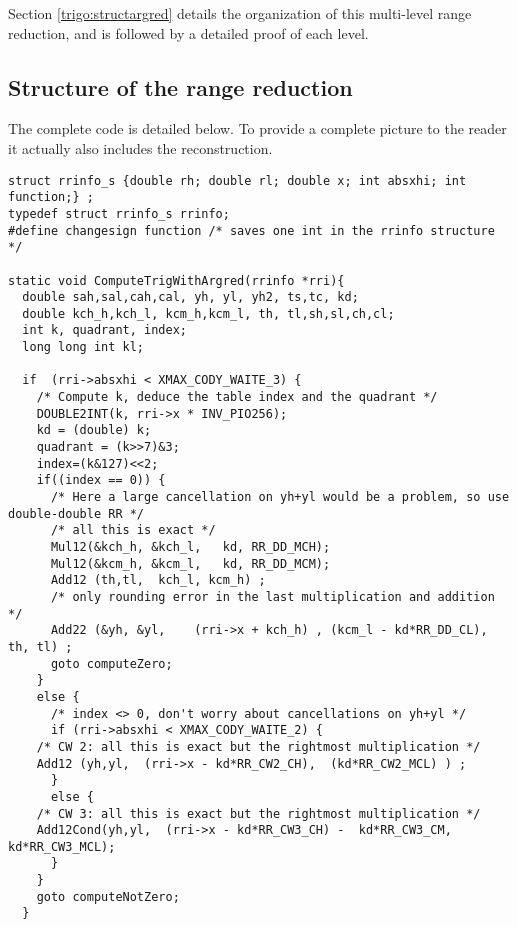 Section \ref{trigo:structargred} details the organization of this
multi-level range reduction, and is followed by a detailed proof of
each level.



\subsection{Structure of the range reduction
  \label{trigo:structargred}} The complete code is detailed below. To
provide a complete picture to the reader it actually also includes the
reconstruction.

\begin{lstlisting}[caption={Multilevel range reduction \label{lst:trig:argred}},firstnumber=1]
struct rrinfo_s {double rh; double rl; double x; int absxhi; int function;} ;
typedef struct rrinfo_s rrinfo;
#define changesign function /* saves one int in the rrinfo structure */

static void ComputeTrigWithArgred(rrinfo *rri){ 
  double sah,sal,cah,cal, yh, yl, yh2, ts,tc, kd; 
  double kch_h,kch_l, kcm_h,kcm_l, th, tl,sh,sl,ch,cl;
  int k, quadrant, index;
  long long int kl;

  if  (rri->absxhi < XMAX_CODY_WAITE_3) {
    /* Compute k, deduce the table index and the quadrant */
    DOUBLE2INT(k, rri->x * INV_PIO256);
    kd = (double) k;
    quadrant = (k>>7)&3;      
    index=(k&127)<<2;
    if((index == 0)) { 
      /* Here a large cancellation on yh+yl would be a problem, so use double-double RR */
      /* all this is exact */
      Mul12(&kch_h, &kch_l,   kd, RR_DD_MCH);
      Mul12(&kcm_h, &kcm_l,   kd, RR_DD_MCM);
      Add12 (th,tl,  kch_l, kcm_h) ;
      /* only rounding error in the last multiplication and addition */ 
      Add22 (&yh, &yl,    (rri->x + kch_h) , (kcm_l - kd*RR_DD_CL),   th, tl) ;
      goto computeZero;
    } 
    else {      
      /* index <> 0, don't worry about cancellations on yh+yl */
      if (rri->absxhi < XMAX_CODY_WAITE_2) {
	/* CW 2: all this is exact but the rightmost multiplication */
	Add12 (yh,yl,  (rri->x - kd*RR_CW2_CH),  (kd*RR_CW2_MCL) ) ; 
      }
      else { 
	/* CW 3: all this is exact but the rightmost multiplication */
	Add12Cond(yh,yl,  (rri->x - kd*RR_CW3_CH) -  kd*RR_CW3_CM,   kd*RR_CW3_MCL);
      }
    }
    goto computeNotZero;
  }


\end{lstlisting}
